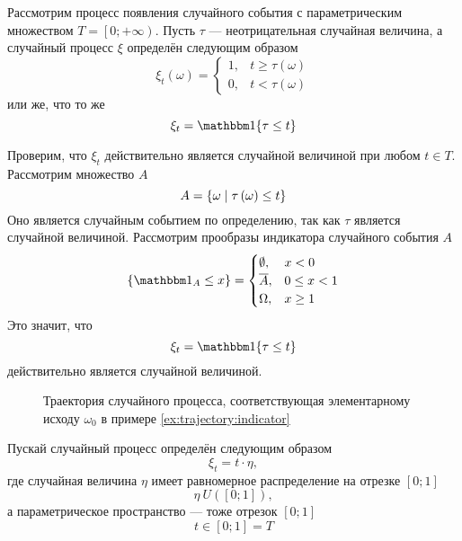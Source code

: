 \begin{example}\label{ex:trajectory:indicator}
  Рассмотрим процесс появления случайного события с параметрическим множеством
  $T = \left[ 0; +\infty \right)$.
  Пусть $\tau$ --- неотрицательная случайная величина, а случайный процесс $\xi$
  определён следующим образом
  \begin{equation*}
    \xi_t\left( \omega \right)
    = \begin{cases}
        1, &t \ge \tau\left( \omega \right) \\
        0, &t < \tau\left( \omega \right)
      \end{cases}
  \end{equation*}
  или же, что то же
  \begin{equation*}
    \xi_t = \Indicator{\tau \le t}
  \end{equation*}

  Проверим, что $\xi_t$ действительно является случайной величиной при любом
  $t \in T$.
  Рассмотрим множество $A$
  \begin{equation*}
    A = \left\{ \omega \;\middle|\; \tau\left( \omega \right) \le t \right\}
  \end{equation*}
  Оно является случайным событием по определению, так как $\tau$ является
  случайной величиной.
  Рассмотрим прообразы индикатора случайного события $A$
  \begin{equation*}
    \left\{ \indicatorof{A} \le x \right\}
    = \begin{cases}
      \emptyset, &x < 0 \\
      \stcomp{A}, &0 \le x < 1 \\
      \Omega, &x \ge 1
    \end{cases}
  \end{equation*}
  Это значит, что
  \begin{equation*}
    \xi_t = \Indicator{\tau \le t}
  \end{equation*}
  действительно является случайной величиной.
\end{example}
\begin{figure}[h!]
  \center
  \caption{Траектория случайного процесса, соответствующая элементарному
    исходу $\omega_0$ в примере \ref{ex:trajectory:indicator}}
  \label{fig:tikz:trajectory:indicator}
\end{figure}

\begin{example}\label{ex:trajectory:uniform}
  Пускай случайный процесс определён следующим образом
  \begin{equation*}
    \xi_t = t \cdot \eta,
  \end{equation*}
  где случайная величина $\eta$ имеет равномерное распределение на отрезке
  $\left[ 0; 1 \right]$
  \begin{equation*}
    \eta ~ U\left( \left[ 0; 1 \right] \right), 
  \end{equation*}
  а параметрическое пространство --- тоже отрезок $\left[ 0; 1 \right]$
  \begin{equation*}
    t \in \left[ 0; 1 \right] = T
  \end{equation*}
\end{example}
